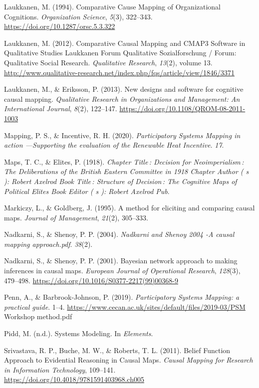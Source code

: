 \documentclass[
]{book}
\begin{document}
Laukkanen, M. (1994). Comparative Cause Mapping of Organizational Cognitions. \emph{Organization Science}, \emph{5}(3), 322--343. \url{https://doi.org/10.1287/orsc.5.3.322}

Laukkanen, M. (2012). Comparative Causal Mapping and CMAP3 Software in Qualitative Studies \textbar{} Laukkanen \textbar{} Forum Qualitative Sozialforschung / Forum: Qualitative Social Research. \emph{Qualitative Research}, \emph{13}(2), volume 13. \url{http://www.qualitative-research.net/index.php/fqs/article/view/1846/3371}

Laukkanen, M., \& Eriksson, P. (2013). New designs and software for cognitive causal mapping. \emph{Qualitative Research in Organizations and Management: An International Journal}, \emph{8}(2), 122--147. \url{https://doi.org/10.1108/QROM-08-2011-1003}

Mapping, P. S., \& Incentive, R. H. (2020). \emph{Participatory Systems Mapping in action ---Supporting the evaluation of the Renewable Heat Incentive}. \emph{17}.

Maps, T. C., \& Elites, P. (1918). \emph{Chapter Title\,: Decision for Neoimperialism\,: The Deliberations of the British Eastern Committee in 1918 Chapter Author ( s ): Robert Axelrod Book Title\,: Structure of Decision\,: The Cognitive Maps of Political Elites Book Editor ( s ): Robert Axelrod Pub}.

Markiczy, L., \& Goldberg, J. (1995). A method for eliciting and comparing causal maps. \emph{Journal of Management}, \emph{21}(2), 305--333.

Nadkarni, S., \& Shenoy, P. P. (2004). \emph{Nadkarni and Shenoy 2004 -A causal mapping approach.pdf}. \emph{38}(2).

Nadkarni, S., \& Shenoy, P. P. (2001). Bayesian network approach to making inferences in causal maps. \emph{European Journal of Operational Research}, \emph{128}(3), 479--498. \url{https://doi.org/10.1016/S0377-2217(99)00368-9}

Penn, A., \& Barbrook-Johnson, P. (2019). \emph{Participatory Systems Mapping: a practical guide}. 1--4. \url{https://www.cecan.ac.uk/sites/default/files/2019-03/PSM} Workshop method.pdf

Pidd, M. (n.d.). Systems Modeling. In \emph{Elements}.

Srivastava, R. P., Buche, M. W., \& Roberts, T. L. (2011). Belief Function Approach to Evidential Reasoning in Causal Maps. \emph{Causal Mapping for Research in Information Technology}, 109--141. \url{https://doi.org/10.4018/9781591403968.ch005}
\end{document}
